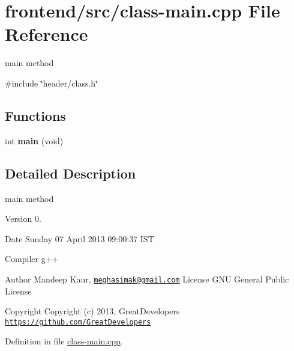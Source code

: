 \hypertarget{class-main_8cpp}{\section{frontend/src/class-\/main.cpp \-File \-Reference}
\label{d7/d38/class-main_8cpp}
}


main method  


{\ttfamily \#include \char`\"{}header/class.\-h\char`\"{}}\*
\subsection*{\-Functions}
\begin{DoxyCompactItemize}
\item 
\hypertarget{class-main_8cpp_a840291bc02cba5474a4cb46a9b9566fe}{int {\bfseries main} (void)}\label{d7/d38/class-main_8cpp_a840291bc02cba5474a4cb46a9b9566fe}

\end{DoxyCompactItemize}


\subsection{\-Detailed \-Description}
main method \begin{DoxyVersion}{\-Version}
0. 
\end{DoxyVersion}
\begin{DoxyDate}{\-Date}
\-Sunday 07 \-April 2013 09\-:00\-:37 \-I\-S\-T\par
 \-Compiler g++
\end{DoxyDate}
\begin{DoxyAuthor}{\-Author}
\-Mandeep \-Kaur, \href{mailto:meghasimak@gmail.com}{\tt meghasimak@gmail.\-com} \-License \-G\-N\-U \-General \-Public \-License 
\end{DoxyAuthor}
\begin{DoxyCopyright}{\-Copyright}
\-Copyright (c) 2013, \-Great\-Developers \href{https://github.com/GreatDevelopers}{\tt https\-://github.\-com/\-Great\-Developers} 
\end{DoxyCopyright}


\-Definition in file \hyperlink{class-main_8cpp_source}{class-\/main.\-cpp}.


